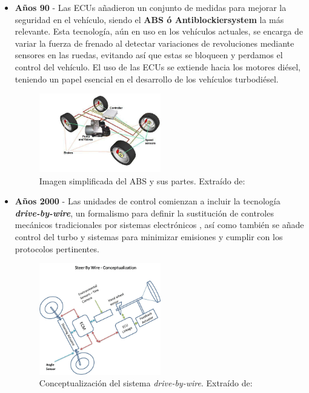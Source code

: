 \begin{itemize}
    \item \textbf{Años 90} - Las ECUs añadieron un conjunto de medidas para mejorar la seguridad en el vehículo, siendo el \textbf{ABS ó Antiblockiersystem} la más relevante. Esta tecnología, aún en uso en los vehículos actuales, se encarga de variar la fuerza de frenado al detectar variaciones de revoluciones mediante sensores en las ruedas, evitando así que estas se bloqueen y perdamos el control del vehículo. El uso de las ECUs se extiende hacia los motores diésel, teniendo un papel esencial en el desarrollo de los vehículos turbodiésel.

    \begin{figure}[h]
        \centering
        \includegraphics[width=0.5\textwidth]{imagenes/esquema_abs.png}
        \caption{Imagen simplificada del ABS y sus partes. Extraído de: \cite{abs}}
    \end{figure}
    
 
    \item \textbf{Años 2000} - Las unidades de control comienzan a incluir la tecnología \textit{\textbf{drive-by-wire}}, un formalismo para definir la sustitución de controles mecánicos tradicionales por sistemas electrónicos \cite{drive_by_wire}, así como también se añade control del turbo y sistemas para minimizar emisiones y cumplir con los protocolos pertinentes.
       

    \begin{figure}[h]
        \centering
        \includegraphics[width=0.5\textwidth]{imagenes/esquema_dbw.png}
        \caption{Conceptualización del sistema \textit{drive-by-wire}. Extraído de: \cite{dbw_img}}
    \end{figure}
          


\end{itemize}
